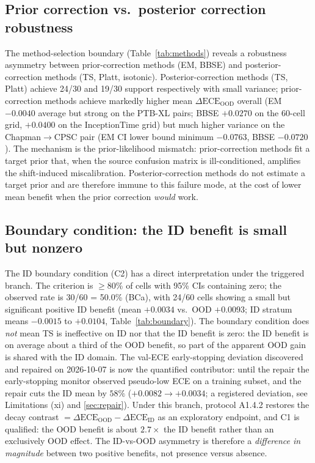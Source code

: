 \documentclass[review,12pt,nonatbib]{elsarticle}
\begin{document}
\subsection{Prior correction vs.\ posterior correction robustness}
The method-selection boundary (Table~\ref{tab:methods}) reveals a
robustness asymmetry between prior-correction methods (EM, BBSE) and
posterior-correction methods (TS, Platt, isotonic). Posterior-correction
methods (TS, Platt) achieve 24/30 and 19/30 support respectively with
small variance; prior-correction methods achieve markedly higher mean
$\Delta\text{ECE}_{\text{OOD}}$ overall (EM $-0.0040$ average but strong
on the PTB-XL pairs; BBSE $+0.0270$ on the 60-cell grid, $+0.0400$ on
the InceptionTime grid) but much higher variance on the
Chapman$\rightarrow$CPSC pair (EM CI lower bound minimum $-0.0763$,
BBSE $-0.0720$). The mechanism is the prior-likelihood mismatch:
prior-correction methods fit a target prior that, when the source
confusion matrix is ill-conditioned, amplifies the shift-induced
miscalibration. Posterior-correction methods do not estimate a target
prior and are therefore immune to this failure mode, at the cost of
lower mean benefit when the prior correction \emph{would} work.

\subsection{Boundary condition: the ID benefit is small but nonzero}
The ID boundary condition (C2) has a direct interpretation under the
triggered branch. The criterion is $\geq$80\% of cells with 95\% CIs
containing zero; the observed rate is 30/60 = 50.0\% (BCa), with
24/60 cells showing a small but significant positive ID benefit
(mean $+0.0034$ vs.\ OOD $+0.0093$; ID stratum means $-0.0015$ to
$+0.0104$, Table~\ref{tab:boundary}). The boundary condition does
\emph{not} mean TS is ineffective on ID nor that the ID benefit is
zero: the ID benefit is on average about a third of the OOD benefit, so
part of the apparent OOD gain is shared with the ID domain. The
val-ECE early-stopping deviation discovered and repaired on
2026-10-07 is now the quantified contributor: until the repair the
early-stopping monitor observed pseudo-low ECE on a training subset,
and the repair cuts the ID mean by $58\%$
($+0.0082 \rightarrow +0.0034$; a registered deviation, see
Limitations (xi) and \ref{sec:repair}).
Under this branch, protocol A1.4.2 restores the decay contrast
$=\Delta\text{ECE}_{\text{OOD}}-\Delta\text{ECE}_{\text{ID}}$ as an
exploratory endpoint, and C1 is qualified: the OOD benefit is about
$2.7\times$ the ID benefit rather than an exclusively OOD effect. The
ID-vs-OOD asymmetry is therefore a \emph{difference in magnitude}
between two positive benefits, not presence versus absence.
\end{document}
